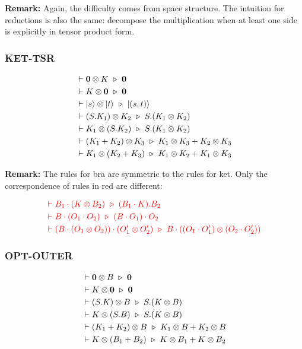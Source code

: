 \textbf{Remark: } Again, the difficulty comes from space structure. The intuition for reductions is also the same: decompose the multiplication when at least one side is explicitly in tensor product form.


\subsubsection*{\textsf{KET-TSR}}
\begin{align*}
  & \vdash \mathbf{0} \otimes K \ \triangleright\  \mathbf{0} \\
  & \vdash K \otimes \mathbf{0} \ \triangleright\  \mathbf{0} \\
  & \vdash |s\rangle \otimes |t\rangle\ \triangleright\ |(s, t)\rangle \\
  & \vdash (S.K_1) \otimes K_2 \ \triangleright\  S.(K_1 \otimes K_2) \\
  & \vdash K_1 \otimes (S.K_2) \ \triangleright\  S.(K_1 \otimes K_2) \\
  & \vdash (K_1 + K_2) \otimes K_3 \ \triangleright\  K_1 \otimes K_3 + K_2 \otimes K_3 \\
  & \vdash K_1 \otimes (K_2 + K_3) \ \triangleright\  K_1 \otimes K_2 + K_1 \otimes K_3
\end{align*}

\textbf{Remark: } The rules for bra are symmetric to the rules for ket. Only the correspondence of rules in red are different:

\begin{align*}
  & \textcolor{red}{\vdash B_1 \cdot (K \otimes B_2) \ \triangleright\  (B_1 \cdot K).B_2} \\
  & \textcolor{red}{\vdash B \cdot (O_1 \cdot O_2) \ \triangleright\  (B \cdot O_1) \cdot O_2} \\
  & \textcolor{red}{\vdash (B \cdot (O_1 \otimes O_2)) \cdot (O_1' \otimes O_2') \ \triangleright\  B \cdot ((O_1 \cdot O_1') \otimes (O_2 \cdot O_2'))}
\end{align*}

\subsubsection*{\textsf{OPT-OUTER}}
\begin{align*}
  & \vdash \mathbf{0} \otimes B \ \triangleright\  \mathbf{0} \\
  & \vdash K \otimes \mathbf{0} \ \triangleright\  \mathbf{0} \\
  & \vdash (S.K) \otimes B \ \triangleright\  S.(K \otimes B) \\
  & \vdash K \otimes (S.B) \ \triangleright\  S.(K \otimes B) \\
  & \vdash (K_1 + K_2) \otimes B \ \triangleright\  K_1 \otimes B + K_2 \otimes B \\
  & \vdash K \otimes (B_1 + B_2) \ \triangleright\  K \otimes B_1 + K \otimes B_2
\end{align*}

